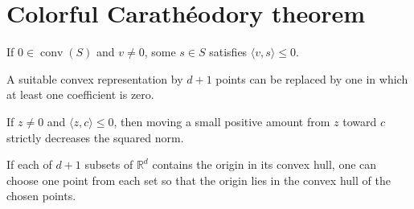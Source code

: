 \section{Colorful Carath\'eodory theorem}

\begin{lemma}
\label{lem:cc-inner}
\leanok
If $0\in\operatorname{conv}(S)$ and $v\ne0$, some $s\in S$ satisfies $\langle v,s\rangle\le0$.
\end{lemma}

\begin{lemma}
\label{lem:cc-zero-coeff}
\leanok
A suitable convex representation by $d+1$ points can be replaced by one in which at least one coefficient is zero.
\end{lemma}

\begin{lemma}
\label{lem:cc-norm-decrease}
\leanok
If $z\ne0$ and $\langle z,c\rangle\le0$, then moving a small positive amount from $z$ toward $c$ strictly decreases the squared norm.
\end{lemma}

\begin{theorem}
\label{thm:colorful-caratheodory}
\leanok
{}
If each of $d+1$ subsets of $\mathbb R^d$ contains the origin in its convex hull, one can choose one point from each set so that the origin lies in the convex hull of the chosen points.
\end{theorem}
